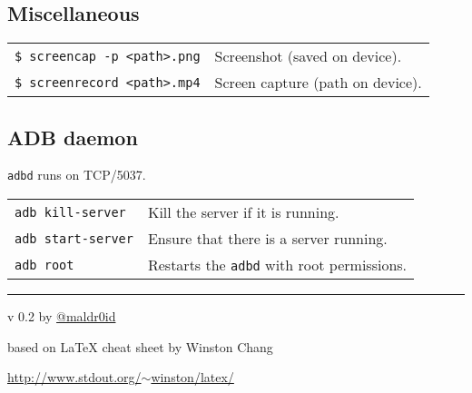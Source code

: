 \documentclass[11pt,landscape,a4paper]{article}
\begin{document}
\begin{multicols}{3}
\subsection{Miscellaneous}
\begin{tabular}{@{}ll@{}}
\texttt{\$ screencap -p <path>.png} & Screenshot (saved on device).\\
\texttt{\$ screenrecord <path>.mp4} & Screen capture (path on device).\\
\end{tabular}

\subsection{ADB daemon}
\texttt{adbd} runs on TCP/5037.

\vspace*{1mm}

\begin{tabular}{@{}ll@{}}

\texttt{adb kill-server}  & Kill the server if it is running.\\
\texttt{adb start-server} & Ensure that there is a server running.\\
\texttt{adb root} & Restarts the \texttt{adbd} with root permissions.\\
\end{tabular}

\rule{0.3\linewidth}{0.25pt}
\scriptsize

v 0.2 by \href{http://www.twitter.com/maldr0id}{@maldr0id}

based on \LaTeX{} cheat sheet by Winston Chang

\href{http://www.stdout.org/~winston/latex/}{http://www.stdout.org/$\sim$winston/latex/}


\end{multicols}
\end{document}
